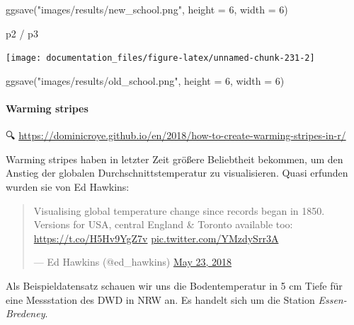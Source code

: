 \documentclass[
]{article}
\newenvironment{Shaded}{\begin{snugshade}}{\end{snugshade}}
\newcommand{\AttributeTok}[1]{\textcolor[rgb]{0.77,0.63,0.00}{#1}}
\newcommand{\DecValTok}[1]{\textcolor[rgb]{0.00,0.00,0.81}{#1}}
\newcommand{\FunctionTok}[1]{\textcolor[rgb]{0.00,0.00,0.00}{#1}}
\newcommand{\NormalTok}[1]{#1}
\newcommand{\SpecialCharTok}[1]{\textcolor[rgb]{0.00,0.00,0.00}{#1}}
\newcommand{\StringTok}[1]{\textcolor[rgb]{0.31,0.60,0.02}{#1}}
\begin{document}
\begin{Shaded}
\begin{Highlighting}[]

\FunctionTok{ggsave}\NormalTok{(}\StringTok{"images/results/new\_school.png"}\NormalTok{, }\AttributeTok{height =} \DecValTok{6}\NormalTok{, }\AttributeTok{width =} \DecValTok{6}\NormalTok{)}

\NormalTok{p2 }\SpecialCharTok{/}\NormalTok{ p3}
\end{Highlighting}
\end{Shaded}

\begin{center}\texttt{[image: documentation\_files/figure-latex/unnamed-chunk-231-2]} \end{center}

\begin{Shaded}
\begin{Highlighting}[]

\FunctionTok{ggsave}\NormalTok{(}\StringTok{"images/results/old\_school.png"}\NormalTok{, }\AttributeTok{height =} \DecValTok{6}\NormalTok{, }\AttributeTok{width =} \DecValTok{6}\NormalTok{)}
\end{Highlighting}
\end{Shaded}

\hypertarget{warming-stripes}{%
\paragraph{Warming stripes}\label{warming-stripes}}

🔍 \url{https://dominicroye.github.io/en/2018/how-to-create-warming-stripes-in-r/}

Warming stripes haben in letzter Zeit größere Beliebtheit bekommen, um den Anstieg der globalen Durchschnittstemperatur zu visualisieren. Quasi erfunden wurden sie von Ed Hawkins:

\begin{quote}
Visualising global temperature change since records began in 1850.
Versions for USA, central England \& Toronto available too:
\url{https://t.co/H5Hv9YgZ7v}
\href{https://t.co/YMzdySrr3A}{pic.twitter.com/YMzdySrr3A}

--- Ed Hawkins (@ed\_hawkins) \href{https://twitter.com/ed_hawkins/status/999242147135188993}{May 23,
2018}
\end{quote}

Als Beispieldatensatz schauen wir uns die Bodentemperatur in 5 cm Tiefe für eine Messstation des DWD in NRW an. Es handelt sich um die Station \emph{Essen-Bredeney}.
\end{document}
